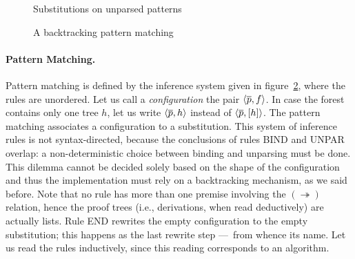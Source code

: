\begin{figure}[t]
\caption{Substitutions on unparsed patterns\label{x_subst_def}}
\end{figure}

\begin{figure}[H]
\caption{A backtracking pattern matching\label{x_match_def}}
\end{figure}

\paragraph{Pattern Matching.}

Pattern matching is defined by the inference system given in
figure~\ref{x_match_def}, where the rules are unordered. Let us call a
\emph{configuration} the pair \(\smat{f}{\overline{p}}\). In case the
forest contains only one tree \(h\), let us write
\(\smat{h}{\overline{p}}\) instead of
\(\smat{[h]}{\overline{p}}\). The pattern matching associates a
configuration to a substitution. This system of inference rules is not
syntax\hyp{}directed, because the conclusions of rules \textsf{BIND}
and \textsf{UNPAR} overlap: a non\hyp{}deterministic choice between
binding and unparsing must be done. This dilemma cannot be decided
solely based on the shape of the configuration and thus the
implementation must rely on a backtracking mechanism, as we said
before. Note that no rule has more than one premise involving the
\((\twoheadrightarrow)\) relation, hence the proof trees (i.e.,
derivations, when read deductively) are actually lists. Rule
\textsf{END} rewrites the empty configuration to the empty
substitution; this happens as the last rewrite step ---~from whence
its name. Let us read the rules inductively, since this reading
corresponds to an algorithm.


